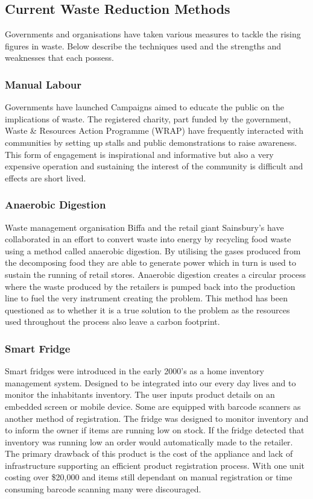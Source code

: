 \documentclass[a4paper, 11pt]{article}
\begin{document}
\subsection{Current Waste Reduction Methods}
Governments and organisations have taken various measures to tackle the rising figures in waste. Below describe the techniques used and the strengths and weaknesses that each possess. 

\subsubsection{Manual Labour} 
Governments have launched Campaigns aimed to educate the public on the implications of waste. The registered charity, part funded by the government, Waste \& Resources Action Programme (WRAP) have frequently interacted with communities by setting up stalls and public demonstrations to raise awareness. This form of engagement is inspirational and informative but also a very expensive operation and sustaining the interest of the community is difficult and effects are short lived.\cite{waste}

\subsubsection{Anaerobic Digestion} 
Waste management organisation Biffa and the retail giant Sainsbury's have collaborated in an effort to convert waste into energy by recycling food waste using a method called anaerobic digestion. By utilising the gases produced from the decomposing food they are able to generate power which in turn is used to sustain the running of retail stores. Anaerobic digestion creates a circular process where the waste produced by the retailers is pumped back into the production line to fuel the very instrument creating the problem. This method has been questioned as to whether it is a true solution to the problem as the resources used throughout the process also leave a carbon footprint.\cite{anarobic}

\subsubsection{Smart Fridge} Smart fridges were introduced in the early 2000's as a home inventory management system. Designed to be integrated into our every day lives and to monitor the inhabitants inventory. The user inputs product details on an embedded screen or mobile device. Some are equipped with barcode scanners as another method of registration. The fridge was designed to monitor inventory and to inform the owner if items are running low on stock. If the fridge detected that inventory was running low an order would automatically made to the retailer. The primary drawback of this product is the cost of the appliance and lack of infrastructure supporting an efficient product registration process. With one unit costing over \$20,000 and items still dependant on manual registration or time consuming barcode scanning many were discouraged.\cite{idiotFridge}
\end{document}
